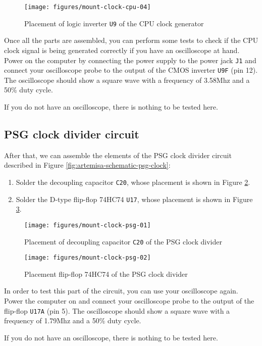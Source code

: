\begin{figure}[htbp]
  \centering
  \texttt{[image: figures/mount-clock-cpu-04]}
  \caption{Placement of logic inverter {\tt U9} of the CPU clock generator}
  \label{fig:mount-clock-cpu-04}
\end{figure}

Once all the parts are assembled, you can perform some tests to check if the CPU clock signal is being generated correctly if you have an oscilloscope at hand. Power on the computer by connecting the power supply to the power jack {\tt J1} and connect your oscilloscope probe to the output of the CMOS inverter {\tt U9F} (pin 12). The oscilloscope should show a square wave with a frequency of 3.58Mhz and a 50\% duty cycle.

If you do not have an oscilloscope, there is nothing to be tested here.

\subsection{PSG clock divider circuit}

After that, we can assemble the elements of the PSG clock divider circuit described in Figure \ref{fig:artemisa-schematic-psg-clock}:

\begin{enumerate}
  \item Solder the decoupling capacitor {\tt C20}, whose placement is shown in Figure \ref{fig:mount-clock-psg-01}.
  \item Solder the D-type flip-flop 74HC74 {\tt U17}, whose placement is shown in Figure \ref{fig:mount-clock-psg-02}.
\end{enumerate}

\begin{figure}[htbp]
  \centering
  \texttt{[image: figures/mount-clock-psg-01]}
  \caption{Placement of decoupling capacitor {\tt C20} of the PSG clock divider}
  \label{fig:mount-clock-psg-01}
\end{figure}

\begin{figure}[htbp]
  \centering
  \texttt{[image: figures/mount-clock-psg-02]}
  \caption{Placement flip-flop 74HC74 of the PSG clock divider}
  \label{fig:mount-clock-psg-02}
\end{figure}

In order to test this part of the circuit, you can use your oscilloscope again. Power the computer on and connect your oscilloscope probe to the output of the flip-flop {\tt U17A} (pin 5). The oscilloscope should show a square wave with a frequency of 1.79Mhz and a 50\% duty cycle.

If you do not have an oscilloscope, there is nothing to be tested here.
